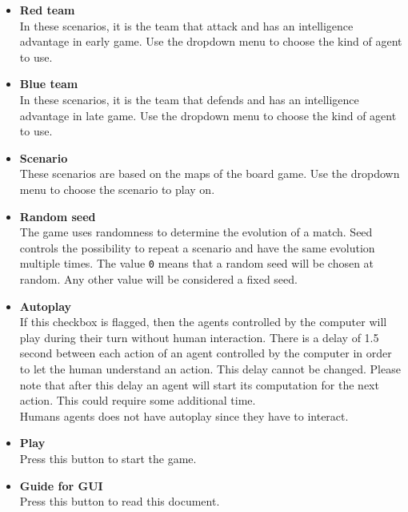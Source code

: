\documentclass[a4paper]{article}
\begin{document}
	\begin{itemize}
		\item \textbf{Red team}\\ In these scenarios, it is the team that attack and has an intelligence advantage in early game. Use the dropdown menu to choose the kind of agent to use.
		
		\item \textbf{Blue team}\\ In these scenarios, it is the team that defends and has an intelligence advantage in late game. Use the dropdown menu to choose the kind of agent to use.
		
		\item \textbf{Scenario}\\ These scenarios are based on the maps of the board game. Use the dropdown menu to choose the scenario to play on.
		
		\item \textbf{Random seed}\\ The game uses randomness to determine the evolution of a match. Seed controls the possibility to repeat a scenario and have the same evolution multiple times. The value \texttt{0} means that a random seed will be chosen at random. Any other value will be considered a fixed seed.
		
		\item \textbf{Autoplay}\\ If this checkbox is flagged, then the agents controlled by the computer will play during their turn without human interaction. There is a delay of 1.5 second between each action of an agent controlled by the computer in order to let the human understand an action. This delay cannot be changed. Please note that after this delay an agent will start its computation for the next action. This could require some additional time.\\
		Humans agents does not have autoplay since they have to interact.
		
		\item \textbf{Play}\\ Press this button to start the game.
		
		\item \textbf{Guide for GUI}\\ Press this button to read this document.
	\end{itemize}

\end{document}
